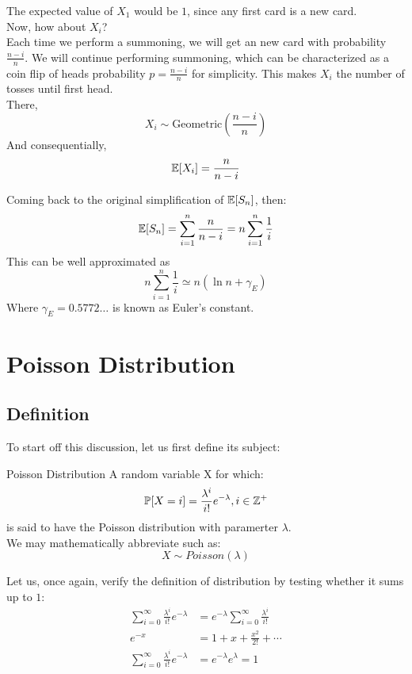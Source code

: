 The expected value of $X_1$ would be $1$, since any first card is a new card. \\
Now, how about $X_i$? \\
Each time we perform a summoning, we will get an new card with probability $\frac{n - i}{n}$. We will continue performing summoning, which can be characterized as a coin flip of heads probability $p = \frac{n - i}{n}$ for simplicity. This makes $X_i$ the number of tosses until first head. \\
There, 
\[X_i \sim \text{Geometric}(\frac{n - i}{n})\]
And consequentially,
\[\mathbb{E}[X_i] = \frac{n}{n - i}\]

Coming back to the original simplification of $\mathbb{E}[S_n]$, then:
\[
    \mathbb{E}[S_n] = \sum_{i = 1}^n \frac{n}{n - i} = n\sum_{i = 1}^n \frac{1}{i}
\]
This can be well approximated as
\[
    n\sum_{i = 1}^n \frac{1}{i} \simeq n(\ln{n} + \gamma_E)
\]
Where $\gamma_E=0.5772\dots$ is known as Euler's constant.

\section{Poisson Distribution}

\subsection{Definition}
To start off this discussion, let us first define its subject:
\begin{ln-define}{Poisson Distribution}{}
    A random variable X for which:
    \[\mathbb{P}[X = i] = \frac{\lambda^i}{i!} e^{-\lambda}, i \in \mathbb{Z}^+\]
    is said to have the Poisson distribution with paramerter $\lambda$. \\
    We may mathematically abbreviate such as:
    \[X \sim Poisson(\lambda)\]
\end{ln-define}
Let us, once again, verify the definition of distribution by testing whether it sums up to $1$:
\begin{align*}
    \sum_{i = 0}^\infty \frac{\lambda^i}{i!} e^{-\lambda}
    &= e^{-\lambda} \sum_{i = 0}^\infty \frac{\lambda^i}{i!} \\
    e^{-x} &= 1 + x + \frac{x^2}{2!} + \cdots \\
    \sum_{i = 0}^\infty \frac{\lambda^i}{i!} e^{-\lambda}
    &= e^{-\lambda} e^{\lambda} = 1
\end{align*}

